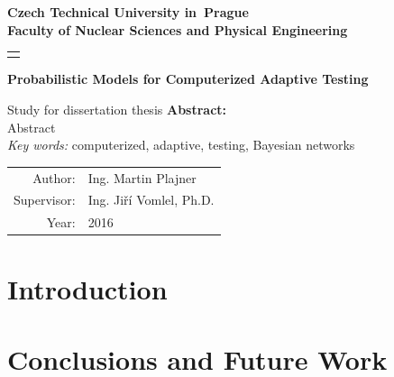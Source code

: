 \documentclass[a4paper,12pt,oneside]{report}
\newcommand{\cvut}{Czech Technical University in~Prague}
\newcommand{\fjfi}{Faculty of Nuclear Sciences and Physical Engineering}
\newcommand{\kse}{}
\newcommand{\nazeven}{Probabilistic Models	 for Computerized Adaptive Testing}     %
\newcommand{\autor}{Ing. Martin Plajner}           %
\newcommand{\rok}{2016}                %
\newcommand{\vedouci}{Ing. Jiří Vomlel, Ph.D.}         %
\newcommand{\keyword}{computerized, adaptive, testing, Bayesian networks}       %
\newcommand{\abstrEN}{Abstract}                  %
\begin{document}
\thispagestyle{empty}

\begin{center}
    {\Large \bf \cvut\\[2mm] \fjfi }
    \vspace{10mm}

    \begin{tabular}{c}
    {\bf \kse}\\
    \end{tabular}

      \vspace{1mm}
    \vspace{10mm}

   {\Huge \bf \nazeven}

   
   {\Large Study for dissertation thesis}
  {\center \textbf{Abstract:} } \\
	\abstrEN  \\
  {\em Key words:} 
	{\keyword}
   \vfill
   {\large
    \begin{tabular}{rl}
    Author: & \autor\\
    Supervisor: & \vedouci\\
    Year: & \rok
    \end{tabular}
   }
\end{center}

\newpage  
\tableofcontents 

\newpage %

\chapter*{Introduction}  
 








\chapter*{Conclusions and Future Work}    
% 
\end{document}
